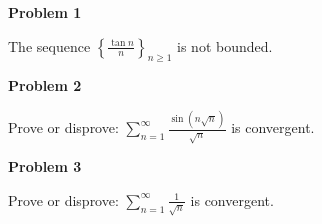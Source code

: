 \documentclass{article}
\begin{document}
\begin{center}
    \textbf{Problem 1}
\end{center}
\begin{problem}{}
    The sequence $\displaystyle \left\{ \frac{\tan n}{n} \right\}_{n \geq 1}$ is not bounded. 
\end{problem}

\vspace{.5cm}
\begin{center}
    \textbf{Problem 2}
\end{center}
\begin{problem}{}
    Prove or disprove: $\displaystyle \sum_{n = 1}^\infty \frac{\sin (n \sqrt{n})}{\sqrt{n}}$ is convergent. 
\end{problem}

\vspace{.5cm}
\begin{center}
    \textbf{Problem 3}
\end{center}
\begin{problem}{}
    Prove or disprove: $\displaystyle \sum_{n = 1}^\infty \frac{1}{\sqrt{n}}$ is convergent. 
\end{problem}
\end{document}
